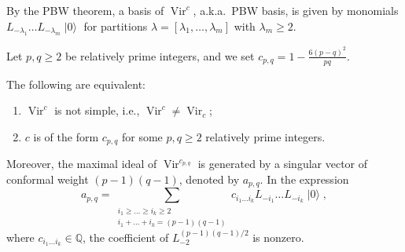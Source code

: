 \documentclass{beamer}
\DeclareMathOperator{\Vir}{Vir}
\DeclareMathOperator{\vac}{|0\rangle}
\begin{document}
\begin{frame}

  By the PBW theorem, a basis of $\Vir^c$, a.k.a.~PBW basis, is given by monomials $L_{-\lambda_1}\dots L_{-\lambda_m}\vac$ for partitions $\lambda = [\lambda_1, \dots, \lambda_m]$ with $\lambda_m \ge 2$.

  Let $p, q \ge 2$ be relatively prime integers, and we set $c_{p, q} = 1 - \frac{6(p - q)^2}{pq}$.

  \begin{theorem}
    \label{thr:1}
    The following are equivalent:
    \begin{enumerate}
    \item $\Vir^c$ is not simple, i.e., $\Vir^c \neq \Vir_c$;
    \item $c$ is of the form $c_{p, q}$ for some $p, q \ge 2$ relatively prime integers.
    \end{enumerate}
    Moreover, the maximal ideal of $\Vir^{c_{p, q}}$ is generated by a singular vector of conformal weight $(p - 1)(q - 1)$, denoted by $a_{p, q}$.
    In the expression
    \begin{equation*}
      a_{p, q} = \sum_{\substack{i_1 \ge \dots \ge i_k \ge 2 \\ i_1 + \dots + i_k = (p - 1)(q - 1)}}c_{i_1\dots i_k}L_{-i_1}\dots L_{-i_k}\vac,
    \end{equation*}
    where $c_{i_1\dots i_k} \in \mathbb{Q}$, the coefficient of $L_{-2}^{(p - 1)(q - 1)/2}$ is nonzero.
  \end{theorem}

\end{frame}
\end{document}
